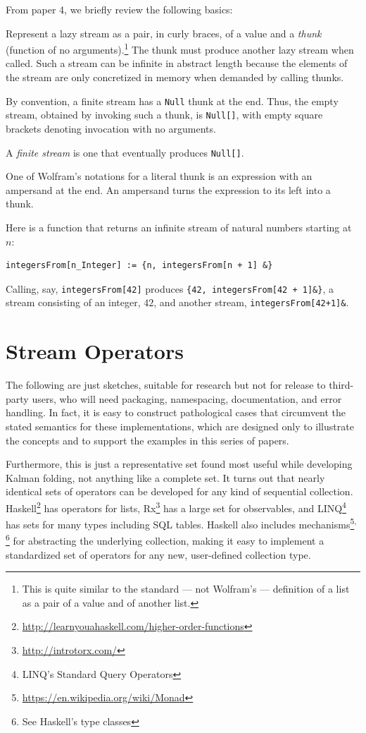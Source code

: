 \documentclass[10pt,oneside,x11names]{article}
\begin{document}
From paper 4, we briefly review the following basics:

Represent a lazy stream as a pair, in curly braces, of a value and a \emph{thunk} (function of
no arguments).\footnote{This is quite similar to the standard --- not  Wolfram's --- definition of a list as a pair of a value and of another list.} The thunk must produce another lazy stream when called. Such
a stream can be infinite in abstract length because the elements of the stream are only
concretized in memory when demanded by calling thunks.

By convention, a finite stream has a \texttt{Null} thunk at the end. Thus, the empty
stream, obtained by invoking such a thunk, is \texttt{Null[]}, with empty square brackets
denoting invocation with no arguments.

A \emph{finite stream} is one that eventually produces \texttt{Null[]}.

One of Wolfram's notations for a literal thunk is an expression with an
ampersand at the end. An ampersand turns the expression to its left
into a thunk.

Here is a function that returns an infinite stream of natural numbers starting at \(n\):

\begin{verbatim}
integersFrom[n_Integer] := {n, integersFrom[n + 1] &}
\end{verbatim}

Calling, say, \texttt{integersFrom[42]} produces \texttt{\{42, integersFrom[42 + 1]\&\}}, a
stream consisting of an integer, \(42\), and another stream,
\texttt{integersFrom[42+1]\&}.

\section{Stream Operators}
\label{sec:orgheadline12}

The following are just sketches, suitable for research but not for release to
third-party users, who will need packaging, namespacing, documentation, and
error handling. In fact, it is easy to construct pathological cases that
circumvent the stated semantics for these implementations, which are designed
only to illustrate the concepts and to support the examples in this series of
papers. 

Furthermore, this is just a representative set found most useful while
developing Kalman folding, not anything like a complete set. It turns out that
nearly identical sets of operators can be developed for any kind of sequential
collection. Haskell\footnote{\url{http://learnyouahaskell.com/higher-order-functions}} has operators for lists, Rx\footnote{\url{http://introtorx.com/}} has a large
set for observables, and LINQ\footnote{LINQ's Standard Query Operators} has sets for many types including SQL
tables. Haskell also includes mechanisms\footnote{\url{https://en.wikipedia.org/wiki/Monad}}\textsuperscript{,}\,\footnote{See Haskell's type classes} for abstracting the
underlying collection, making it easy to implement a standardized set of
operators for any new, user-defined collection type.
\end{document}
